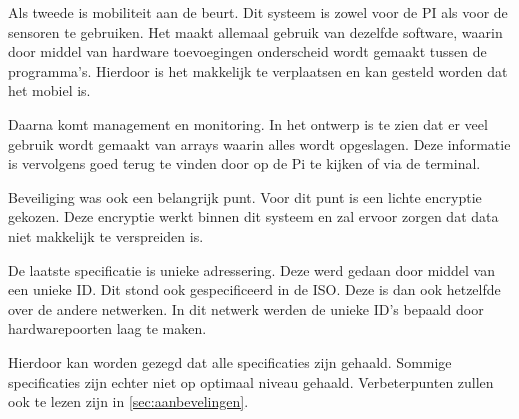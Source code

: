 Als tweede is mobiliteit aan de beurt. Dit systeem is zowel voor de PI als voor de sensoren te gebruiken. Het maakt allemaal gebruik van dezelfde software, waarin door middel van hardware toevoegingen onderscheid wordt gemaakt tussen de programma's. Hierdoor is het makkelijk te verplaatsen en kan gesteld worden dat het mobiel is.

Daarna komt management en monitoring. In het ontwerp is te zien dat er veel gebruik wordt gemaakt van arrays waarin alles wordt opgeslagen. Deze informatie is vervolgens goed terug te vinden door op de Pi te kijken of via de terminal.

Beveiliging was ook een belangrijk punt. Voor dit punt is een lichte encryptie gekozen. Deze encryptie werkt binnen dit systeem en zal ervoor zorgen dat data niet makkelijk te verspreiden is.

De laatste specificatie is unieke adressering. Deze werd gedaan door middel van een unieke ID. Dit stond ook gespecificeerd in de ISO. Deze is dan ook hetzelfde over de andere netwerken. In dit netwerk werden de unieke ID's bepaald door hardwarepoorten laag te maken.

Hierdoor kan worden gezegd dat alle specificaties zijn gehaald. Sommige specificaties zijn echter niet op optimaal niveau gehaald. Verbeterpunten zullen ook te lezen zijn in \autoref{sec:aanbevelingen}.
